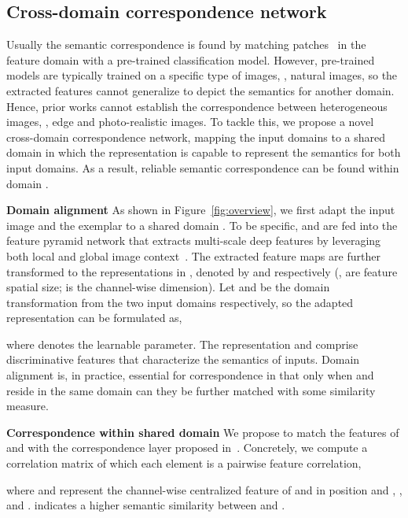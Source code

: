 \documentclass[10pt,twocolumn,letterpaper]{article}
\begin{document}
\subsection{Cross-domain correspondence network}
\label{sec:cross_domain}
Usually the semantic correspondence is found by matching patches~\cite{liao2017visual,lee2019sfnet} in the feature domain with a pre-trained classification model. However, pre-trained models are typically trained on a specific type of images, \eg, natural images, so the extracted features cannot generalize to depict the semantics for another domain. Hence, prior works cannot establish the correspondence between heterogeneous images, \eg, edge and photo-realistic images. To tackle this, we propose a novel cross-domain correspondence network, mapping the input domains to a shared domain  in which the representation is capable to represent the semantics for both input domains. As a result, reliable semantic correspondence can be found within domain .

\vspace{0.4em}
\noindent\textbf{Domain alignment} As shown in Figure~\ref{fig:overview}, we first adapt the input image and the exemplar to a shared domain . To be specific,  and  are fed into the feature pyramid network that extracts multi-scale deep features by leveraging both local and global image context~\cite{ronneberger2015u,lin2017feature}. The extracted feature maps are further transformed to the representations in , denoted by  and  respectively (, are feature spatial size;  is the channel-wise dimension). Let  and  be the domain transformation from the two input domains respectively, so the adapted representation can be formulated as,

where  denotes the learnable parameter. The representation  and  comprise discriminative features that characterize the semantics of inputs. Domain alignment is, in practice, essential for correspondence in that only when  and  reside in the same domain can they be further matched with some similarity measure. 
 
\vspace{0.4em}
\noindent\textbf{Correspondence within shared domain}
We propose to match the features of  and  with the correspondence layer proposed in~\cite{zhang2019deep}. Concretely, we compute a correlation matrix  of which each element is a pairwise feature correlation,

where  and  represent the channel-wise centralized feature of  and  in position  and , \ie,  and .
 indicates a higher semantic similarity between  and . 
\end{document}
